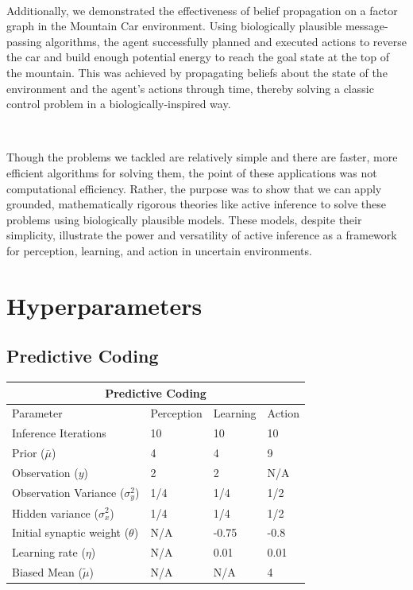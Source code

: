 \documentclass{article}
\begin{document}
\

Additionally, we demonstrated the effectiveness of belief propagation on a factor graph in the Mountain Car environment. Using biologically plausible message-passing algorithms, the agent successfully planned and executed actions to reverse the car and build enough potential energy to reach the goal state at the top of the mountain. This was achieved by propagating beliefs about the state of the environment and the agent's actions through time, thereby solving a classic control problem in a biologically-inspired way.

\

Though the problems we tackled are relatively simple and there are faster, more efficient algorithms for solving them, the point of these applications was not computational efficiency. Rather, the purpose was to show that we can apply grounded, mathematically rigorous theories like active inference to solve these problems using biologically plausible models. These models, despite their simplicity, illustrate the power and versatility of active inference as a framework for perception, learning, and action in uncertain environments.

\newpage



\newpage

\appendix

\section{Hyperparameters}\label{appendix:hyperparameters}

\subsection{Predictive Coding}

\begin{tabular}{ |p{3cm}||p{3cm}|p{3cm}|p{3cm}|  }
 \hline
 \multicolumn{4}{|c|}{Predictive Coding} \\
 \hline
 Parameter & Perception & Learning & Action\\
 \hline
 Inference Iterations	   				& 10 & 10 & 10	\\
 Prior ($\bar{\mu}$) 					& 4  & 4  & 9	\\
 Observation ($y$)						& 2 	 & 2  & N/A \\
 Observation Variance ($\sigma^2_y$)		& 1/4  & 1/4  & 1/2	\\
 Hidden variance ($\sigma^2_x$)			& 1/4  & 1/4  & 1/2	\\
 Initial synaptic weight ($\theta$)		& N/A  & -0.75  & -0.8	\\
 Learning rate ($\eta$)					& N/A  & 0.01  & 0.01	\\
 Biased Mean ($\tilde{\mu}$)				& N/A  & N/A  & 4	\\
 \hline
\end{tabular}
\end{document}
